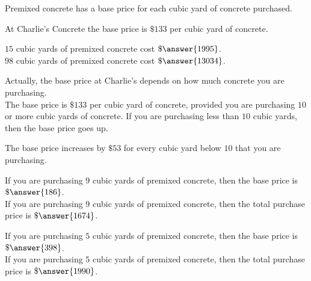 \documentclass{ximera}
\author{Alan Yang}
\begin{document}
Premixed concrete has a base price for each cubic yard of concrete purchased.


At Charlie's Concrete the base price is $\$133$ per cubic yard of concrete.




\begin{exercise}

$15$ cubic yards of premixed concrete cost $\$\answer{1995}$. \\

$98$ cubic yards of premixed concrete cost $\$\answer{13034}$. \\

\end{exercise}



Actually, the base price at Charlie's depends on how much concrete you are purchasing. \\


The base price is $\$133$ per cubic yard of concrete, provided you are purchasing $10$ or more cubic yards of concrete.  If you are purchasing less than $10$ cubic yards, then the base price goes up.

The base price increases by $\$53$ for every cubic yard below $10$ that you are purchasing. 







\begin{exercise}

If you are purchasing $9$ cubic yards of premixed concrete, then the base price is $\$\answer{186}$. \\

If you are purchasing $9$ cubic yards of premixed concrete, then the total purchase price is $\$\answer{1674}$. \\

\end{exercise}







\begin{exercise}

If you are purchasing $5$ cubic yards of premixed concrete, then the base price is $\$\answer{398}$. \\

If you are purchasing $5$ cubic yards of premixed concrete, then the total purchase price is $\$\answer{1990}$. \\

\end{exercise}
\end{document}
